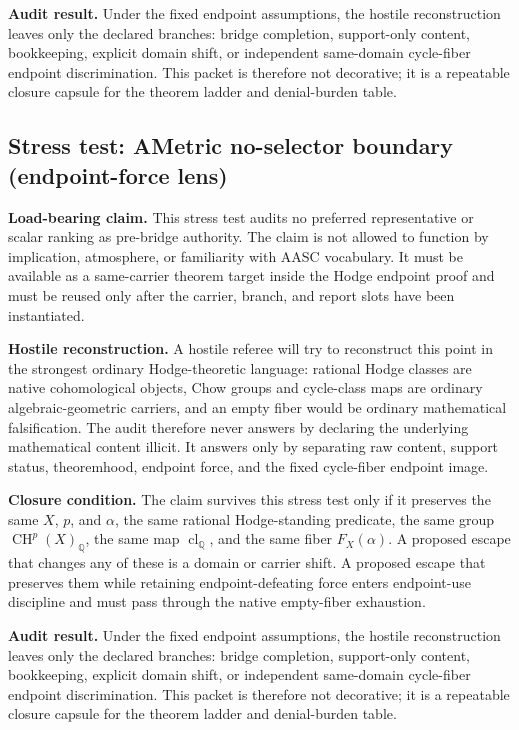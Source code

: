 \documentclass[11pt]{article}
\newcommand{\QQ}{\mathbb{Q}}
\newcommand{\CH}{\operatorname{CH}}
\newcommand{\clQ}{\operatorname{cl}_{\QQ}}
\begin{document}
\par\noindent\textbf{Audit result.} Under the fixed endpoint assumptions, the hostile reconstruction leaves only the declared branches: bridge completion, support-only content, bookkeeping, explicit domain shift, or independent same-domain cycle-fiber endpoint discrimination. This packet is therefore not decorative; it is a repeatable closure capsule for the theorem ladder and denial-burden table.


\subsection{Stress test: AMetric no-selector boundary (endpoint-force lens)}

\par\noindent\textbf{Load-bearing claim.} This stress test audits no preferred representative or scalar ranking as pre-bridge authority. The claim is not allowed to function by implication, atmosphere, or familiarity with AASC vocabulary. It must be available as a same-carrier theorem target inside the Hodge endpoint proof and must be reused only after the carrier, branch, and report slots have been instantiated.

\par\noindent\textbf{Hostile reconstruction.} A hostile referee will try to reconstruct this point in the strongest ordinary Hodge-theoretic language: rational Hodge classes are native cohomological objects, Chow groups and cycle-class maps are ordinary algebraic-geometric carriers, and an empty fiber would be ordinary mathematical falsification. The audit therefore never answers by declaring the underlying mathematical content illicit. It answers only by separating raw content, support status, theoremhood, endpoint force, and the fixed cycle-fiber endpoint image.

\par\noindent\textbf{Closure condition.} The claim survives this stress test only if it preserves the same $X$, $p$, and $\alpha$, the same rational Hodge-standing predicate, the same group $\CH^p(X)_\QQ$, the same map $\clQ$, and the same fiber $F_X(\alpha)$. A proposed escape that changes any of these is a domain or carrier shift. A proposed escape that preserves them while retaining endpoint-defeating force enters endpoint-use discipline and must pass through the native empty-fiber exhaustion.

\par\noindent\textbf{Audit result.} Under the fixed endpoint assumptions, the hostile reconstruction leaves only the declared branches: bridge completion, support-only content, bookkeeping, explicit domain shift, or independent same-domain cycle-fiber endpoint discrimination. This packet is therefore not decorative; it is a repeatable closure capsule for the theorem ladder and denial-burden table.
\end{document}
